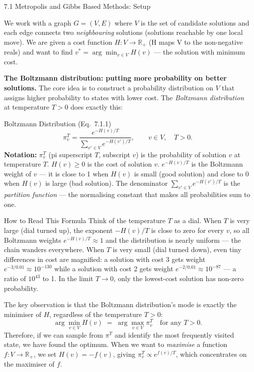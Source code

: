 \documentclass[aspectratio=169,10pt]{beamer}
\begin{document}
\begin{frame}[allowframebreaks]{7.1 Metropolis and Gibbs Based Methods: Setup}

We work with a graph $G = (V, E)$ where $V$ is the set of candidate
solutions and each edge connects two \emph{neighbouring} solutions (solutions
reachable by one local move).  We are given a cost function
$H : V \to \mathbb{R}_+$ (H maps V to the non-negative reals) and want to
find $v^* = \arg\min_{v \in V} H(v)$ --- the solution with minimum cost.

\medskip
\textbf{The Boltzmann distribution: putting more probability on better solutions.}
The core idea is to construct a probability distribution on $V$ that assigns
higher probability to states with lower cost.  The \emph{Boltzmann
distribution} at temperature $T > 0$ does exactly this:

\begin{block}{Boltzmann Distribution (Eq.~7.1.1)}
  \[
    \pi^T_v = \frac{e^{-H(v)/T}}{\displaystyle\sum_{v' \in V} e^{-H(v')/T}},
    \qquad v \in V, \quad T > 0.
  \]
  \textbf{Notation:} $\pi^T_v$ (pi superscript $T$, subscript $v$) is the
  probability of solution $v$ at temperature $T$.  $H(v) \ge 0$ is the cost
  of solution $v$.  $e^{-H(v)/T}$ is the Boltzmann weight of $v$ --- it is
  close to 1 when $H(v)$ is small (good solution) and close to 0 when
  $H(v)$ is large (bad solution).  The denominator
  $\sum_{v' \in V} e^{-H(v')/T}$ is the \emph{partition function} --- the
  normalising constant that makes all probabilities sum to one.
\end{block}

\begin{alertblock}{How to Read This Formula}
  Think of the temperature $T$ as a dial.  When $T$ is very large (dial
  turned up), the exponent $-H(v)/T$ is close to zero for every $v$, so all
  Boltzmann weights $e^{-H(v)/T} \approx 1$ and the distribution is nearly
  uniform --- the chain wanders everywhere.  When $T$ is very small (dial
  turned down), even tiny differences in cost are magnified: a solution with
  cost 3 gets weight $e^{-3/0.01} \approx 10^{-130}$ while a solution with
  cost 2 gets weight $e^{-2/0.01} \approx 10^{-87}$ --- a ratio of $10^{43}$
  to 1.  In the limit $T \to 0$, only the lowest-cost solution has non-zero
  probability.
\end{alertblock}

The key observation is that the Boltzmann distribution's mode is exactly the
minimiser of $H$, regardless of the temperature $T > 0$:
\[
  \arg\min_{v \in V} H(v) \;=\; \arg\max_{v \in V} \pi^T_v \quad
  \text{for any } T > 0.
\]
Therefore, if we can sample from $\pi^T$ and identify the most frequently
visited state, we have found the optimum.  When we want to \emph{maximise}
a function $f : V \to \mathbb{R}_+$, we set $H(v) = -f(v)$, giving
$\pi^T_v \propto e^{f(v)/T}$, which concentrates on the maximiser of $f$.


\end{frame}
\end{document}

